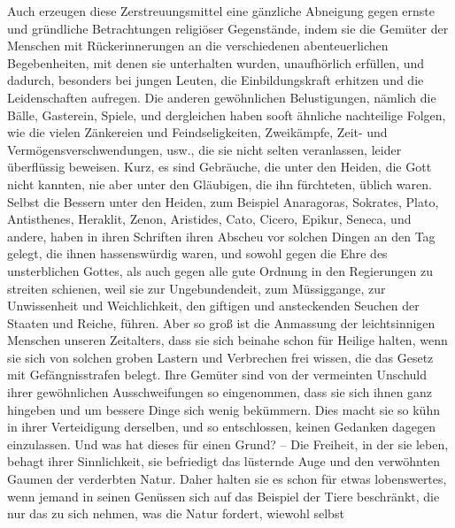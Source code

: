 Auch erzeugen diese Zerstreuungsmittel eine gänzliche Abneigung gegen ernste und
gründliche Betrachtungen religiöser Gegenstände, indem sie die Gemüter der
Menschen mit Rückerinnerungen an die verschiedenen abenteuerlichen
Begebenheiten, mit denen sie unterhalten wurden, unaufhörlich erfüllen, und
dadurch, besonders bei jungen Leuten, die
Einbildungskraft
erhitzen und die
Leidenschaften aufregen. Die anderen gewöhnlichen
Belustigungen, nämlich die
Bälle, Gasterein, Spiele, und dergleichen haben sooft ähnliche nachteilige
Folgen, wie
die vielen Zänkereien und Feindseligkeiten, Zweikämpfe, Zeit- und
Vermögensverschwendungen, usw., die sie nicht selten veranlassen, leider
überflüssig beweisen. Kurz, es sind Gebräuche, die unter den
Heiden, die Gott
nicht kannten, nie aber unter den Gläubigen, die ihn fürchteten, üblich waren.
Selbst die Bessern unter den Heiden, zum Beispiel
Anaragoras,
Sokrates, Plato,
Antisthenes, Heraklit,
Zenon, Aristides,
Cato,
Cicero, Epikur,
Seneca, und
andere, haben in ihren Schriften ihren Abscheu vor solchen Dingen an den Tag
gelegt, die ihnen hassenswürdig waren, und sowohl gegen die Ehre des
unsterblichen Gottes, als auch gegen alle gute Ordnung in den
Regierungen zu
streiten schienen, weil sie zur Ungebundendeit, zum Müssiggange, zur
Unwissenheit
und Weichlichkeit, den giftigen und ansteckenden Seuchen der
Staaten und
Reiche,
führen. Aber so groß ist die Anmassung der leichtsinnigen Menschen unseren
Zeitalters, dass sie sich beinahe schon für Heilige halten, wenn sie sich von
solchen groben Lastern und Verbrechen frei wissen, die das Gesetz mit
Gefängnisstrafen belegt. Ihre Gemüter sind von der vermeinten Unschuld ihrer
gewöhnlichen Ausschweifungen so eingenommen, dass sie sich ihnen ganz hingeben
und um bessere Dinge sich wenig bekümmern. Dies macht sie so kühn in ihrer
Verteidigung derselben, und so entschlossen, keinen Gedanken dagegen
einzulassen. Und was hat dieses für einen Grund? -- Die Freiheit, in der sie
leben, behagt ihrer Sinnlichkeit, sie befriedigt das lüsternde Auge und den
verwöhnten Gaumen der verderbten Natur. Daher halten sie es schon für etwas
lobenswertes, wenn jemand in seinen Genüssen sich auf das Beispiel der Tiere
beschränkt, die nur das zu sich nehmen, was die Natur fordert, wiewohl selbst
